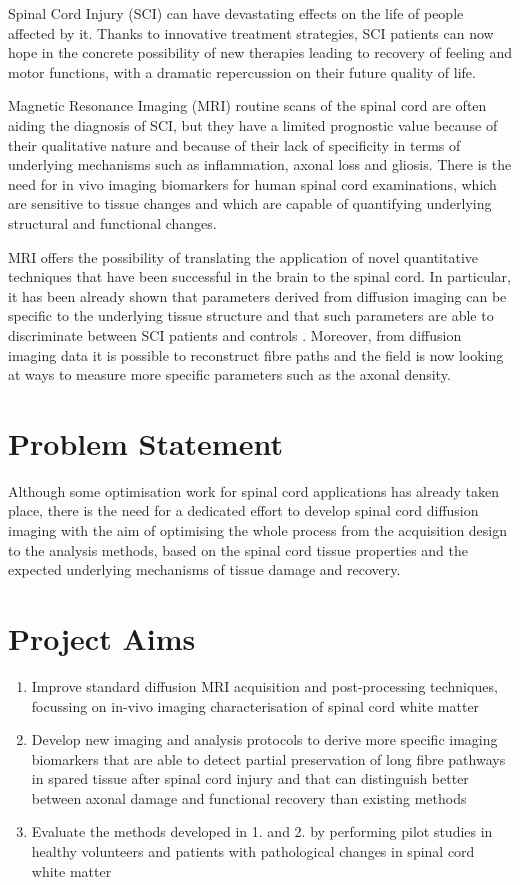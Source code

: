 Spinal Cord Injury (SCI) can have devastating effects on the life of people affected by it. Thanks to innovative treatment strategies, SCI patients can now hope in the concrete possibility of new therapies leading to recovery of feeling and motor functions, with a dramatic repercussion on their future quality of life.

Magnetic Resonance Imaging (MRI) routine scans of the spinal cord are often aiding the diagnosis of SCI, but they have a limited prognostic value because of their qualitative nature and because of their lack of specificity in terms of underlying mechanisms such as inflammation, axonal loss and gliosis. There is the need for in vivo imaging biomarkers for human spinal cord examinations, which are sensitive to tissue changes and which are capable of quantifying underlying structural and functional changes.

MRI offers the possibility of translating the application of novel quantitative techniques that have been successful in the brain to the spinal cord. In particular, it has been already shown that parameters derived from diffusion imaging can be specific to the underlying tissue structure and that such parameters are able to discriminate between SCI patients and controls \cite{TODO}. Moreover, from diffusion imaging data it is possible to reconstruct fibre paths and the field is now looking at ways to measure more specific parameters such as the axonal density.
\section{Problem Statement}
Although some optimisation work for spinal cord applications has already taken place, there is the need for a dedicated effort to develop spinal cord diffusion imaging with the aim of optimising the whole process from the acquisition design to the analysis methods, based on the spinal cord tissue properties and the expected underlying mechanisms of tissue damage and recovery.

\section{Project Aims}
\begin{enumerate}
	\item Improve standard diffusion MRI acquisition and post-processing techniques, focussing on in-vivo imaging characterisation of spinal cord white matter
	\item Develop new imaging and analysis protocols to derive more specific imaging biomarkers that are able to detect partial preservation of long fibre pathways in spared tissue after spinal cord injury and that can distinguish better between axonal damage and functional recovery than existing methods
	\item Evaluate the methods developed in 1. and 2. by performing pilot studies in healthy volunteers and patients with pathological changes in spinal cord white matter
\end{enumerate}
